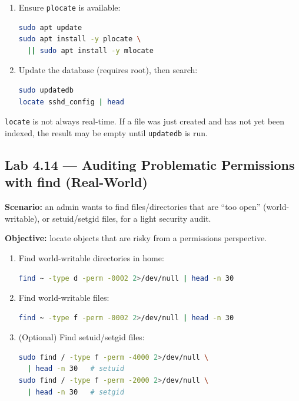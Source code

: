 \begin{enumerate}
    \item Ensure \texttt{plocate} is available:
\begin{lstlisting}[language=bash, caption={Installing the locate tool}]
sudo apt update
sudo apt install -y plocate \
  || sudo apt install -y mlocate
\end{lstlisting}

    \item Update the database (requires root), then search:
\begin{lstlisting}[language=bash, caption={Updating the locate database and searching}]
sudo updatedb
locate sshd_config | head
\end{lstlisting}
\end{enumerate}

\begin{warningbox}
\texttt{locate} is not always real-time. If a file was just created and has not
yet been indexed, the result may be empty until \texttt{updatedb} is run.
\end{warningbox}

\subsection*{Lab 4.14 --- Auditing Problematic Permissions with find (Real-World)}
\textbf{Scenario:} an admin wants to find files/directories that are ``too
open'' (world-writable), or setuid/setgid files, for a light security audit.

\textbf{Objective:} locate objects that are risky from a permissions
perspective.

\begin{enumerate}
    \item Find world-writable directories in home:
\begin{lstlisting}[language=bash, caption={Finding world-writable directories}]
find ~ -type d -perm -0002 2>/dev/null | head -n 30
\end{lstlisting}

    \item Find world-writable files:
\begin{lstlisting}[language=bash, caption={Finding world-writable files}]
find ~ -type f -perm -0002 2>/dev/null | head -n 30
\end{lstlisting}

    \item (Optional) Find setuid/setgid files:
\begin{lstlisting}[language=bash, caption={Auditing setuid/setgid on the system (requires sudo)}]
sudo find / -type f -perm -4000 2>/dev/null \
  | head -n 30   # setuid
sudo find / -type f -perm -2000 2>/dev/null \
  | head -n 30   # setgid
\end{lstlisting}
\end{enumerate}

